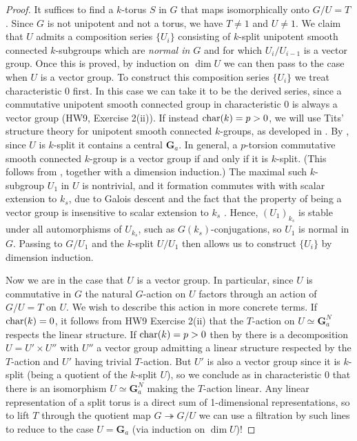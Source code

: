 \documentclass[10pt]{article}
\renewcommand{\(}{\left(}
\renewcommand{\)}{\right)}
\numberwithin{thm}{subsection}
\begin{document}
\begin{proof}
It suffices to find a $k$-torus $S$ in $G$ that maps isomorphically onto $G/U = T$. 
Since $G$ is not unipotent and not a torus, we have $T \ne 1$ and $U \ne 1$.
We claim that $U$ admits a composition series $\{U_i\}$ consisting
of $k$-split unipotent smooth connected $k$-subgroups which are {\em normal in $G$}
and for which $U_i/U_{i-1}$ is a vector group.  Once this is proved,
by induction on $\dim U$ we can then pass to the case when $U$ is a vector group. 
To construct this composition series $\{U_i\}$ we treat characteristic 0 first.
In this case we can take it to be the derived series, since a commutative unipotent
smooth connected group in characteristic 0 is always a vector group (HW9, Exercise 2(ii)). 
If instead ${\rm{char}}(k) = p > 0$, we will use Tits' structure theory for unipotent 
smooth connected $k$-groups, as developed in \cite[App.\,B]{pred}. 
By \cite[Prop.\,B.3.2]{pred}, since $U$ is $k$-split it contains a central
$\mathbf{G}_a$.  In general, a 
$p$-torsion commutative smooth connected $k$-group 
is a vector group if and only if it is $k$-split.
(This follows from \cite[Lemma B.1.10, Cor.\,B.1.12]{pred}, together with a dimension induction.)
The maximal such $k$-subgroup $U_1$ in $U$ is nontrivial, and it
formation commutes with with scalar extension to $k_s$, due to Galois descent
and the fact that the property of being a vector group
is insensitive to scalar extension to $k_s$ \cite[Cor.\,B.2.6]{pred}. 
Hence, $(U_1)_{k_s}$ is stable under all automorphisms of
$U_{k_s}$, such as $G(k_s)$-conjugations, so
$U_1$ is normal in $G$.  Passing to $G/U_1$ and the $k$-split
$U/U_1$ then allows us to construct $\{U_i\}$ by dimension induction.  

Now we are in the case that $U$ is a vector group.  In particular,
since $U$ is commutative in $G$ the natural $G$-action on 
$U$ factors through an action of $G/U = T$ on $U$. We wish
to describe this action in more concrete terms.    If ${\rm{char}}(k) = 0$,
it follows from HW9 Exercise 2(ii) that the $T$-action on $U \simeq
\mathbf{G}_a^N$ respects the linear structure.   If
${\rm{char}}(k) = p > 0$ then by \cite[Thm.\,B.4.3]{pred} there 
is a decomposition $U = U' \times U''$ with
$U''$ a vector group admitting a linear structure respected
by the $T$-action and $U'$ having trivial $T$-action.
But $U'$ is also a vector group since it is $k$-split
(being a quotient of the $k$-split $U$), so we conclude
as in characteristic 0 that there is an isomorphism
$U \simeq \mathbf{G}_a^N$ making the $T$-action linear.  
Any linear representation of a split torus is a direct sum of 1-dimensional
representations, so to lift $T$ through the quotient map
$G \twoheadrightarrow G/U$ we can use a filtration by such lines
to reduce to the case $U = \mathbf{G}_a$
(via induction on $\dim U$)!


\end{proof}
\end{document}
